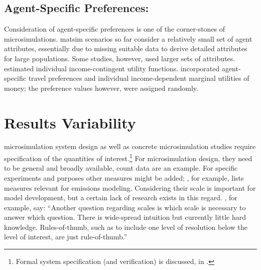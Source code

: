 \subsection{Agent-Specific Preferences:}
\label{sec:agent-specific-prefs}
Consideration of agent-specific preferences is one of the corner-stones of \glspl{microsimulation}. \gls{matsim} scenarios so far consider a relatively small set of agent attributes, essentially due to missing suitable data to derive detailed attributes for large populations. Some studies, however, used larger sets of attributes. \citet{GretherEtAl2010TrbIncomeInTRR, KickhoeferEtAl2011PolicyEvaluationIncome} estimated individual income-contingent utility functions. \citet[][]{HorniEtAl_TechRep_IVT_2012_a, HorniAxhausen_TechRep_IVT_2014} incorporated agent-specific travel preferences and individual income-dependent marginal utilities of money; the preference values however, were assigned randomly.


\vfill\eject
\section{Results Variability}
\label{sec:variability}
\Gls{microsimulation} system design as well as concrete \gls{microsimulation} studies require specification of the quantities of interest.\footnote{%
Formal system specification (and verification) is discussed, \eg in \citet[][]{FisherWooldridge_IJCIS_1997, BourahlaBenmohamed_ENTCS_2005}. 
} For microsimulation design, they need to be general and broadly available, count data are an example. For specific experiments and purposes other measures might be added; \citet[][]{Kitamura_TMIP_1996}, for example, lists measures relevant for emissions modeling. Considering their scale is important for model development, but a certain lack of research exists in this regard. \citet[][Section 2.2]{NagelAxhausen200Xiatbr00-report}, for example, say: ``Another question regarding scales is which scale is necessary to answer which question. There is wide-spread intuition but currently little hard knowledge. Rules-of-thumb, such as to include one level of resolution below the level of interest, are just rule-of-thumb.'' 

